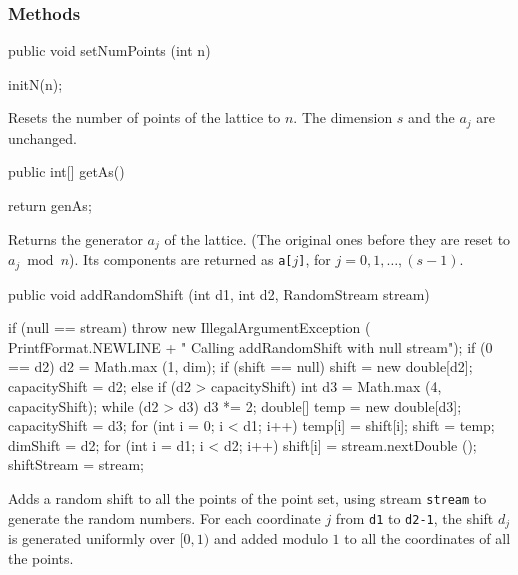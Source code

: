 \subsubsection*{Methods}
\begin{code}

   public void setNumPoints (int n) \begin{hide} {
      initN(n);
   }\end{hide}
\end{code}
\begin{tabb}
  Resets the number of points of the lattice to $n$. The dimension  $s$ and
  the $a_j$ are unchanged.
\end{tabb}
\begin{code}

   public int[] getAs() \begin{hide} {
      return genAs;
   }\end{hide}
\end{code}
\begin{tabb}
Returns the generator $a_j$ of the lattice. (The original ones before they are
reset to $a_j \bmod n$). Its components
  are returned as \texttt{a[$j$]}, for $j = 0, 1, \ldots, (s-1)$.
\end{tabb}
\begin{code}

   public void addRandomShift (int d1, int d2, RandomStream stream) \begin{hide} {
      if (null == stream)
         throw new IllegalArgumentException (
              PrintfFormat.NEWLINE +
                  "   Calling addRandomShift with null stream");
      if (0 == d2)
         d2 = Math.max (1, dim);
      if (shift == null) {
         shift = new double[d2];
         capacityShift = d2;
      } else if (d2 > capacityShift) {
         int d3 = Math.max (4, capacityShift);
         while (d2 > d3)
            d3 *= 2;
         double[] temp = new double[d3];
         capacityShift = d3;
         for (int i = 0; i < d1; i++)
            temp[i] = shift[i];
         shift = temp;
      }
      dimShift = d2;
      for (int i = d1; i < d2; i++)
         shift[i] = stream.nextDouble ();
      shiftStream = stream;
   }\end{hide}
\end{code}
\begin{tabb}  Adds a random shift to all the points of the point set,
  using stream \texttt{stream} to generate the random numbers.
  For each coordinate $j$ from \texttt{d1} to \texttt{d2-1},
  the shift $d_{j}$ is generated uniformly over $[0, 1)$ and added modulo $1$ to
  all the coordinates of all the points.
\end{tabb}
